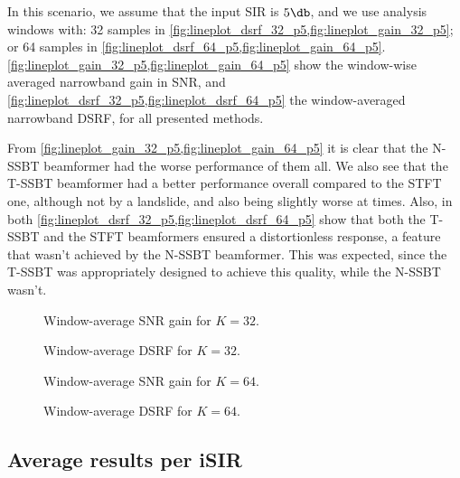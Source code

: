 In this scenario, we assume that the input SIR is $5\dB$, and we use analysis windows with: 32 samples in \cref{fig:lineplot_dsrf_32_p5,fig:lineplot_gain_32_p5}; or 64 samples in \cref{fig:lineplot_dsrf_64_p5,fig:lineplot_gain_64_p5}. \cref{fig:lineplot_gain_32_p5,fig:lineplot_gain_64_p5} show the window-wise averaged narrowband gain in SNR, and \cref{fig:lineplot_dsrf_32_p5,fig:lineplot_dsrf_64_p5} the window-averaged narrowband DSRF, for all presented methods.

From \cref{fig:lineplot_gain_32_p5,fig:lineplot_gain_64_p5} it is clear that the N-SSBT beamformer had the worse performance of them all. We also see that the T-SSBT beamformer had a better performance overall compared to the STFT one, although not by a landslide, and also being slightly worse at times. Also, in both \cref{fig:lineplot_dsrf_32_p5,fig:lineplot_dsrf_64_p5} show that both the T-SSBT and the STFT beamformers ensured a distortionless response, a feature that wasn't achieved by the N-SSBT beamformer. This was expected, since the T-SSBT was appropriately designed to achieve this quality, while the N-SSBT wasn't.


\begin{figure}[H]
\centering

\caption{Window-average SNR gain for $K = 32$.}
\label{fig:lineplot_gain_32_p5}
\end{figure}
\begin{figure}[H]
	\centering
	
	\caption{Window-average DSRF for $K = 32$.}
	\label{fig:lineplot_dsrf_32_p5}
\end{figure}
%	


\begin{figure}[H]
\centering

\caption{Window-average SNR gain for $K = 64$.}
\label{fig:lineplot_gain_64_p5}
\end{figure}
\begin{figure}[H]
	\centering
	
	\caption{Window-average DSRF for $K = 64$.}
	\label{fig:lineplot_dsrf_64_p5}
\end{figure}

\subsection{Average results per iSIR}

